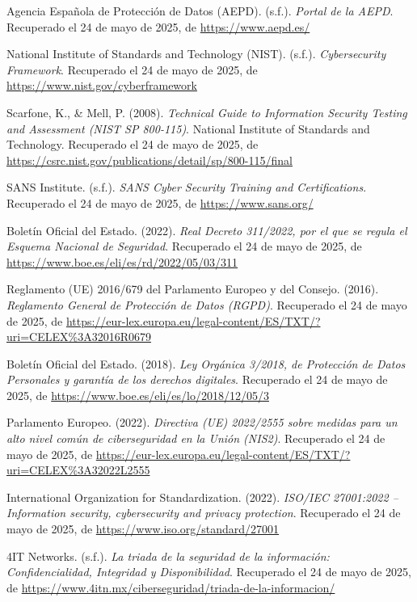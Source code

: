 \documentclass[a4paper, 10pt]{article}
\begin{document}
\begin{thebibliography}{20}
Agencia Española de Protección de Datos (AEPD). (s.f.). \textit{Portal de la AEPD}. Recuperado el 24 de mayo de 2025, de \url{https://www.aepd.es/}

National Institute of Standards and Technology (NIST). (s.f.). \textit{Cybersecurity Framework}. Recuperado el 24 de mayo de 2025, de \url{https://www.nist.gov/cyberframework}

Scarfone, K., \& Mell, P. (2008). \textit{Technical Guide to Information Security Testing and Assessment (NIST SP 800-115)}. National Institute of Standards and Technology. Recuperado el 24 de mayo de 2025, de \url{https://csrc.nist.gov/publications/detail/sp/800-115/final}

SANS Institute. (s.f.). \textit{SANS Cyber Security Training and Certifications}. Recuperado el 24 de mayo de 2025, de \url{https://www.sans.org/}

Boletín Oficial del Estado. (2022). \textit{Real Decreto 311/2022, por el que se regula el Esquema Nacional de Seguridad}. Recuperado el 24 de mayo de 2025, de \url{https://www.boe.es/eli/es/rd/2022/05/03/311}

Reglamento (UE) 2016/679 del Parlamento Europeo y del Consejo. (2016). \textit{Reglamento General de Protección de Datos (RGPD)}. Recuperado el 24 de mayo de 2025, de \url{https://eur-lex.europa.eu/legal-content/ES/TXT/?uri=CELEX%3A32016R0679}

Boletín Oficial del Estado. (2018). \textit{Ley Orgánica 3/2018, de Protección de Datos Personales y garantía de los derechos digitales}. Recuperado el 24 de mayo de 2025, de \url{https://www.boe.es/eli/es/lo/2018/12/05/3}

Parlamento Europeo. (2022). \textit{Directiva (UE) 2022/2555 sobre medidas para un alto nivel común de ciberseguridad en la Unión (NIS2)}. Recuperado el 24 de mayo de 2025, de \url{https://eur-lex.europa.eu/legal-content/ES/TXT/?uri=CELEX%3A32022L2555}

International Organization for Standardization. (2022). \textit{ISO/IEC 27001:2022 – Information security, cybersecurity and privacy protection}. Recuperado el 24 de mayo de 2025, de \url{https://www.iso.org/standard/27001}

4IT Networks. (s.f.). \textit{La triada de la seguridad de la información: Confidencialidad, Integridad y Disponibilidad}. Recuperado el 24 de mayo de 2025, de \url{https://www.4itn.mx/ciberseguridad/triada-de-la-informacion/}


\end{thebibliography}
\end{document}

